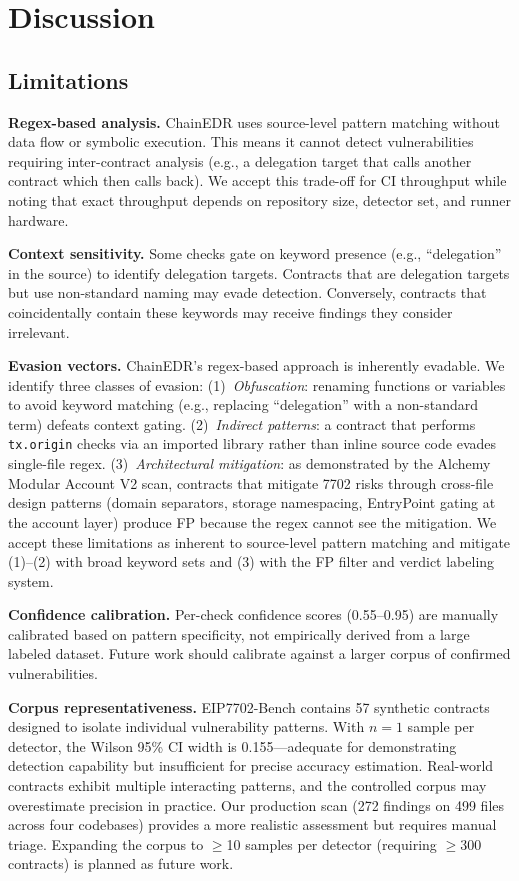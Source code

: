 \section{Discussion}
\label{sec:discussion}

\subsection{Limitations}

\textbf{Regex-based analysis.} ChainEDR uses source-level pattern matching without data flow or symbolic execution. This means it cannot detect vulnerabilities requiring inter-contract analysis (e.g., a delegation target that calls another contract which then calls back). We accept this trade-off for CI throughput while noting that exact throughput depends on repository size, detector set, and runner hardware.

\textbf{Context sensitivity.} Some checks gate on keyword presence (e.g., ``delegation'' in the source) to identify delegation targets. Contracts that are delegation targets but use non-standard naming may evade detection. Conversely, contracts that coincidentally contain these keywords may receive findings they consider irrelevant.

\textbf{Evasion vectors.} ChainEDR's regex-based approach is inherently evadable. We identify three classes of evasion: (1)~\textit{Obfuscation}: renaming functions or variables to avoid keyword matching (e.g., replacing ``delegation'' with a non-standard term) defeats context gating. (2)~\textit{Indirect patterns}: a contract that performs \texttt{tx.origin} checks via an imported library rather than inline source code evades single-file regex. (3)~\textit{Architectural mitigation}: as demonstrated by the Alchemy Modular Account V2 scan, contracts that mitigate 7702 risks through cross-file design patterns (domain separators, storage namespacing, EntryPoint gating at the account layer) produce FP because the regex cannot see the mitigation. We accept these limitations as inherent to source-level pattern matching and mitigate (1)--(2) with broad keyword sets and (3) with the FP filter and verdict labeling system.

\textbf{Confidence calibration.} Per-check confidence scores (0.55--0.95) are manually calibrated based on pattern specificity, not empirically derived from a large labeled dataset. Future work should calibrate against a larger corpus of confirmed vulnerabilities.

\textbf{Corpus representativeness.} EIP7702-Bench contains 57 synthetic contracts designed to isolate individual vulnerability patterns. With $n=1$ sample per detector, the Wilson 95\% CI width is 0.155---adequate for demonstrating detection capability but insufficient for precise accuracy estimation. Real-world contracts exhibit multiple interacting patterns, and the controlled corpus may overestimate precision in practice. Our production scan (272 findings on 499 files across four codebases) provides a more realistic assessment but requires manual triage. Expanding the corpus to $\geq$10 samples per detector (requiring $\geq$300 contracts) is planned as future work.

